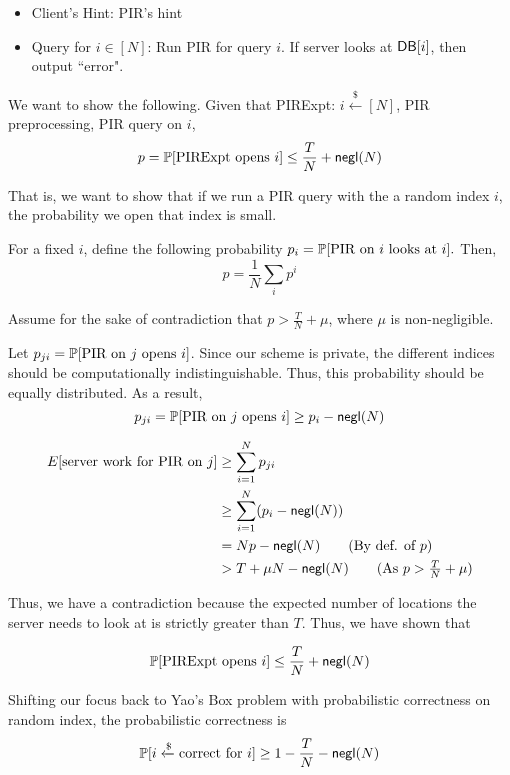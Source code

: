 \begin{itemize}
    \item Client's Hint: PIR's hint
    \item Query for $i \in [N]$: Run PIR for query $i$. If server looks at ${\sf DB}[i]$, then output ``error".
\end{itemize}

We want to show the following. Given that PIRExpt: $i \xleftarrow{\$} [N]$, PIR preprocessing, PIR query on $i$,
\[p =\mathbb{P}[\text{PIRExpt opens $i$}] \le \frac{T}{N} + {\sf negl}(N)\]

That is, we want to show that if we run a PIR query with the a random index $i$, the probability we open that index is small.

For a fixed $i$, define the following probability $p_i = \mathbb{P}[\text{PIR on $i$ looks at $i$}].$ Then, 
\[p =\frac{1}{N} \sum_i p^i\]

Assume for the sake of contradiction that  $p > \frac{T}{N} + \mu$, where $\mu$ is non-negligible.

Let $p_{ji} = \mathbb{P}[\text{PIR on $j$ opens $i$}]$. Since our scheme is private, the different indices should be computationally indistinguishable. Thus, this probability should be equally distributed. As a result,
\[p_{ji} = \mathbb{P}[\text{PIR on $j$ opens $i$}] \ge p_i - {\sf negl}(N)\]

\begin{align*}
    E[\text{server work for PIR on $j$}] &\ge \sum_{i=1}^N p_{ji} \\
    &\ge \sum_{i=1}^N (p_{i} - \negl(N))\\
    &= Np - \negl(N) \tag{By def. of $p$}\\
    &> T + \mu N - \negl(N) \tag{As $p > \frac{T}{N} + \mu$}\\ 
\end{align*}

Thus, we have a contradiction because the expected number of locations the server needs to look at is strictly greater than $T$. Thus, we have shown that 

\[\mathbb{P}[\text{PIRExpt opens $i$}] \le \frac{T}{N} + {\sf negl}(N)\]

\vspace{5mm}

Shifting our focus back to Yao's Box problem with probabilistic correctness on random index, the probabilistic correctness is
\[\mathbb{P}[i \xleftarrow{\$} \text{correct for $i$}] \ge 1 - \frac{T}{N} - {\sf negl}(N)\]

